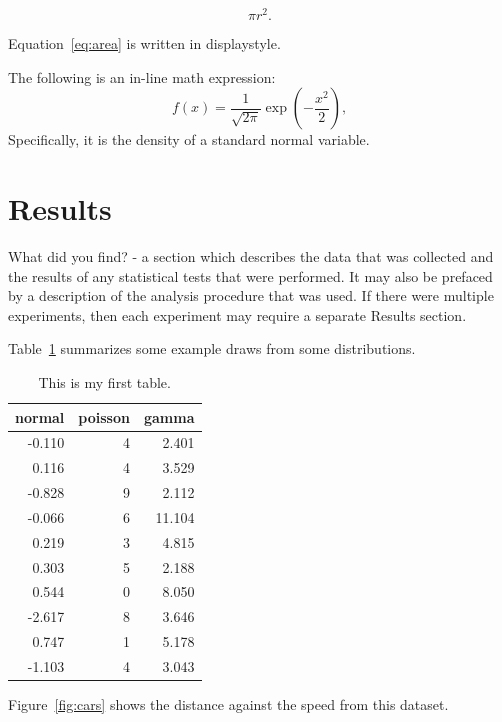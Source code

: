 \documentclass[12pt]{article}
\begin{document}
\begin{equation}
    \label{eq:area}
    \pi r^2.
\end{equation}

Equation~\eqref{eq:area} is written in displaystyle.

The following is an in-line math expression:
\[
  f(x) = \frac{1}{\sqrt{2\pi}} \exp\left( - \frac{x^2}{2} \right),
\]
Specifically, it is the density of a standard normal variable.

\section*{Results}
\label{sec:resu}

What did you find? - a section which describes the data that was collected and the results of any statistical tests that were performed.  It may also be prefaced by a description of the analysis procedure that was used. If there were multiple experiments, then each experiment may require a separate Results section.

Table~\ref{tab:rv} summarizes some example draws from some distributions.

\begin{table}[ht]
  \caption{This is my first table.}
  \label{tab:rv}
\centering
\begin{tabular}{rrr}
  \hline
normal & poisson & gamma \\ 
  \hline
-0.110 & 4 & 2.401 \\ 
  0.116 & 4 & 3.529 \\ 
  -0.828 & 9 & 2.112 \\ 
  -0.066 & 6 & 11.104 \\ 
  0.219 & 3 & 4.815 \\ 
  0.303 & 5 & 2.188 \\ 
  0.544 & 0 & 8.050 \\ 
  -2.617 & 8 & 3.646 \\ 
  0.747 & 1 & 5.178 \\ 
  -1.103 & 4 & 3.043 \\ 
   \hline
\end{tabular}
\end{table}

Figure~\ref{fig:cars} shows the distance against the speed from this dataset.
\end{document}
